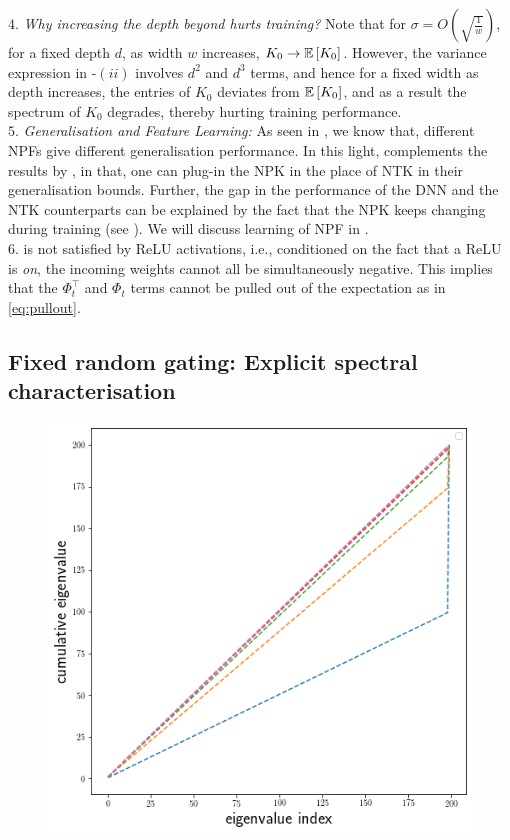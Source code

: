 $4.$ \emph{Why increasing the depth beyond hurts training?} Note that for $\sigma=O\left(\sqrt{\frac{1}{w}}\right)$, for a fixed depth $d$, as width $w$ increases, $K_0\rightarrow\mathbb{E}\left[K_0\right]$. However, the variance expression in -$(ii)$ involves $d^2$ and $d^3$ terms, and hence for a fixed width as depth increases, the entries of $K_0$ deviates from $\mathbb{E}\left[K_0\right]$, and as a result the spectrum of $K_0$ degrades, thereby hurting training performance.\\
$5.$ \emph{Generalisation and Feature Learning:} As seen in , we know that, different NPFs give different generalisation performance. In this light,  complements the results by \cite{arora2019exact,cao2019generalization}, in that, one can plug-in the NPK in the place of NTK in their generalisation bounds. Further, the gap in the performance of the DNN and the NTK counterparts can be explained by the fact that the NPK keeps changing during training (see ). We will discuss learning of NPF in .\\
$6.$  is not satisfied by ReLU activations, i.e., conditioned on the fact that a ReLU is \emph{on}, the incoming weights cannot all be simultaneously negative. This implies that the $\Phi^\top_t$ and $\Phi_t$ terms cannot be pulled out of the expectation as in \eqref{eq:pullout}.
\subsection{Fixed random gating: Explicit spectral characterisation} 
\begin{figure}
\includegraphics[scale=0.22]{figs/dgn-fra-ecdf-ideal.png}
\end{figure}

